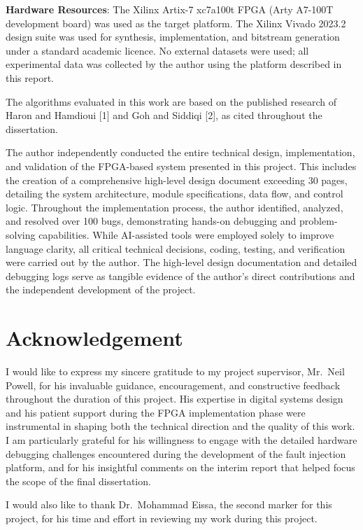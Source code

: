 \textbf{Hardware Resources}: The Xilinx Artix-7 xc7a100t FPGA (Arty
A7-100T development board) was used as the target platform. The Xilinx
Vivado 2023.2 design suite was used for synthesis, implementation, and
bitstream generation under a standard academic licence. No external
datasets were used; all experimental data was collected by the author
using the platform described in this report.

The algorithms evaluated in this work are based on the published
research of Haron and Hamdioui {[}1{]} and Goh and Siddiqi {[}2{]}, as
cited throughout the dissertation.

The author independently conducted the entire technical design,
implementation, and validation of the FPGA-based system presented in
this project. This includes the creation of a comprehensive high-level
design document exceeding 30 pages, detailing the system architecture,
module specifications, data flow, and control logic. Throughout the
implementation process, the author identified, analyzed, and resolved
over 100 bugs, demonstrating hands-on debugging and problem-solving
capabilities. While AI-assisted tools were employed solely to improve
language clarity, all critical technical decisions, coding, testing, and
verification were carried out by the author. The high-level design
documentation and detailed debugging logs serve as tangible evidence of
the author's direct contributions and the independent development of the
project.

\section{Acknowledgement}\label{acknowledgement}

I would like to express my sincere gratitude to my project supervisor,
Mr.~Neil Powell, for his invaluable guidance, encouragement, and
constructive feedback throughout the duration of this project. His
expertise in digital systems design and his patient support during the
FPGA implementation phase were instrumental in shaping both the
technical direction and the quality of this work. I am particularly
grateful for his willingness to engage with the detailed hardware
debugging challenges encountered during the development of the fault
injection platform, and for his insightful comments on the interim
report that helped focus the scope of the final dissertation.

I would also like to thank Dr.~Mohammad Eissa, the second marker for
this project, for his time and effort in reviewing my work during this
project.

